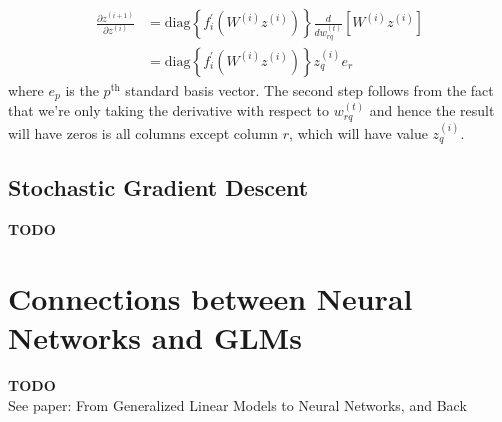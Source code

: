 \documentclass[12pt]{article}
\begin{document}
\begin{align*}
\frac{\partial z^{(i + 1)}}{\partial z^{(i)}} &= \text{diag}\left\{f_{i}^\prime(W^{(i)}z^{(i)})\right\} \frac{d}{dw_{rq}^{(t)}} \left[W^{(i)} z^{(i)} \right]\\
							 &= \text{diag}\left\{f_{i}^\prime(W^{(i)}z^{(i)})\right\} z_q^{(i)} e_r
\end{align*}
where $e_p$ is the $p^\text{th}$ standard basis vector. The second step follows from the fact that we're only taking the derivative with respect to $w_{rq}^{(t)}$ and hence the result will have zeros
is all columns except column $r$, which will have value $z_q^{(i)}$. 




\subsection{Stochastic Gradient Descent}
\textbf{TODO}


\section{Connections between Neural Networks and GLMs}
\textbf{TODO}\\
See paper: From Generalized Linear Models to Neural Networks, and Back
\end{document}
